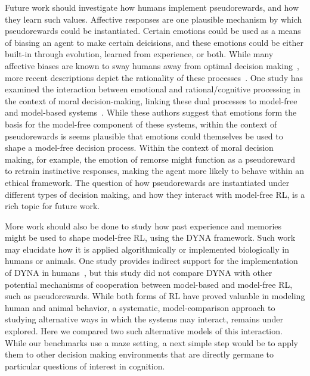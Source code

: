 \documentclass[notitlepage]{article}
\begin{document}
Future work should investigate how humans implement pseudorewards, and how they learn such values. Affective responses are one plausible mechanism by which pseudorewards could be instantiated. Certain emotions could be used as a means of biasing an agent to make certain deicisions, and these emotions could be either built-in through evolution, learned from experience, or both. While many affective biases are known to sway humans away from optimal decision making~\cite{kahneman1979prospect}, more recent descriptions depict the rationality of these processes~\cite{griffiths2008bayesian}. One study has examined the interaction between emotional and rational/cognitive processing in the context of moral decision-making, linking these dual processes to model-free and model-based systems~\cite{cushman2013action}. While these authors suggest that emotions form the basis for the model-free component of these systems, within the context of pseudorewards is seems plausible that emotions could themselves be used to shape a model-free decision process. Within the context of moral decision making, for example, the emotion of remorse might function as a pseudoreward to retrain instinctive responses, making the agent more likely to behave within an ethical framework. The question of how pseudorewards are instantiated under different types of decision making, and how they interact with model-free RL, is a rich topic for future work.

More work should also be done to study how past experience and memories might be used to shape model-free RL, using the DYNA framework. Such work may elucidate how it is applied algorithmically or implemented biologically in humans or animals. One study provides indirect support for the implementation of DYNA in humans~\cite{gershman2014retrospective}, but this study did not compare DYNA with other potential mechanisms of cooperation between model-based and model-free RL, such as pseudorewards. While both forms of RL have proved valuable in modeling human and animal behavior, a systematic, model-comparison approach to studying alternative ways in which the systems may interact, remains under explored. Here we compared two such alternative models of this interaction. While our benchmarks use a maze setting, a next simple step would be to apply them to other decision making environments that are directly germane to particular questions of interest in cognition.

{}

\end{document}
